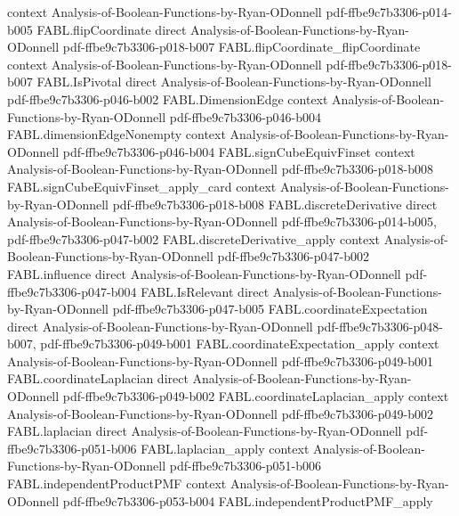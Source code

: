 \begin{theorem}
  {context}
  {Analysis-of-Boolean-Functions-by-Ryan-ODonnell}
  {pdf-ffbe9c7b3306-p014-b005}
\proofstep
  {FABL.flipCoordinate}
  {direct}
  {Analysis-of-Boolean-Functions-by-Ryan-ODonnell}
  {pdf-ffbe9c7b3306-p018-b007}
\proofstep
  {FABL.flipCoordinate_flipCoordinate}
  {context}
  {Analysis-of-Boolean-Functions-by-Ryan-ODonnell}
  {pdf-ffbe9c7b3306-p018-b007}
\proofstep
  {FABL.IsPivotal}
  {direct}
  {Analysis-of-Boolean-Functions-by-Ryan-ODonnell}
  {pdf-ffbe9c7b3306-p046-b002}
\proofstep
  {FABL.DimensionEdge}
  {context}
  {Analysis-of-Boolean-Functions-by-Ryan-ODonnell}
  {pdf-ffbe9c7b3306-p046-b004}
\proofstep
  {FABL.dimensionEdgeNonempty}
  {context}
  {Analysis-of-Boolean-Functions-by-Ryan-ODonnell}
  {pdf-ffbe9c7b3306-p046-b004}
\proofstep
  {FABL.signCubeEquivFinset}
  {context}
  {Analysis-of-Boolean-Functions-by-Ryan-ODonnell}
  {pdf-ffbe9c7b3306-p018-b008}
\proofstep
  {FABL.signCubeEquivFinset_apply_card}
  {context}
  {Analysis-of-Boolean-Functions-by-Ryan-ODonnell}
  {pdf-ffbe9c7b3306-p018-b008}
\proofstep
  {FABL.discreteDerivative}
  {direct}
  {Analysis-of-Boolean-Functions-by-Ryan-ODonnell}
  {pdf-ffbe9c7b3306-p014-b005,
    pdf-ffbe9c7b3306-p047-b002}
\proofstep
  {FABL.discreteDerivative_apply}
  {context}
  {Analysis-of-Boolean-Functions-by-Ryan-ODonnell}
  {pdf-ffbe9c7b3306-p047-b002}
\proofstep
  {FABL.influence}
  {direct}
  {Analysis-of-Boolean-Functions-by-Ryan-ODonnell}
  {pdf-ffbe9c7b3306-p047-b004}
\proofstep
  {FABL.IsRelevant}
  {direct}
  {Analysis-of-Boolean-Functions-by-Ryan-ODonnell}
  {pdf-ffbe9c7b3306-p047-b005}
\proofstep
  {FABL.coordinateExpectation}
  {direct}
  {Analysis-of-Boolean-Functions-by-Ryan-ODonnell}
  {pdf-ffbe9c7b3306-p048-b007,
    pdf-ffbe9c7b3306-p049-b001}
\proofstep
  {FABL.coordinateExpectation_apply}
  {context}
  {Analysis-of-Boolean-Functions-by-Ryan-ODonnell}
  {pdf-ffbe9c7b3306-p049-b001}
\proofstep
  {FABL.coordinateLaplacian}
  {direct}
  {Analysis-of-Boolean-Functions-by-Ryan-ODonnell}
  {pdf-ffbe9c7b3306-p049-b002}
\proofstep
  {FABL.coordinateLaplacian_apply}
  {context}
  {Analysis-of-Boolean-Functions-by-Ryan-ODonnell}
  {pdf-ffbe9c7b3306-p049-b002}
\proofstep
  {FABL.laplacian}
  {direct}
  {Analysis-of-Boolean-Functions-by-Ryan-ODonnell}
  {pdf-ffbe9c7b3306-p051-b006}
\proofstep
  {FABL.laplacian_apply}
  {context}
  {Analysis-of-Boolean-Functions-by-Ryan-ODonnell}
  {pdf-ffbe9c7b3306-p051-b006}
\proofstep
  {FABL.independentProductPMF}
  {context}
  {Analysis-of-Boolean-Functions-by-Ryan-ODonnell}
  {pdf-ffbe9c7b3306-p053-b004}
\proofstep
  {FABL.independentProductPMF_apply}

\end{theorem}
